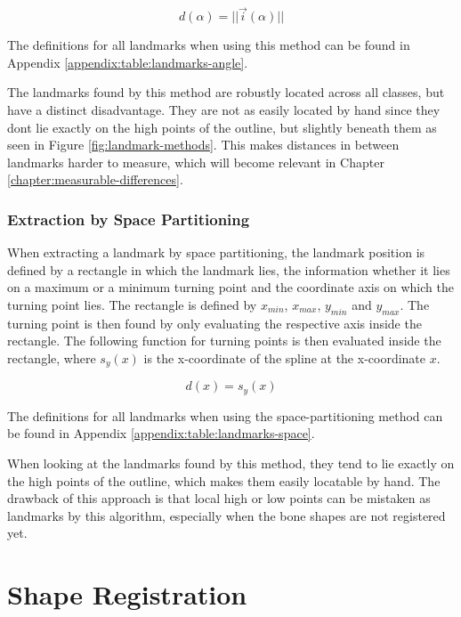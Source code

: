 \documentclass[pdftex,12pt,a4paper]{report}
\begin{document}
\begin{equation}
d(\alpha) = ||\vec{i}(\alpha)||
\end{equation}

The definitions for all landmarks when using this method can be found in Appendix \ref{appendix:table:landmarks-angle}.

The landmarks found by this method are robustly located across all classes, but have a distinct disadvantage. They are
not as easily located by hand since they dont lie exactly on the high points of the outline, but slightly beneath
them  as seen in Figure \ref{fig:landmark-methods}. This makes distances in between landmarks harder to measure, which
will become relevant in Chapter \ref{chapter:measurable-differences}.

\subsubsection{Extraction by Space Partitioning}

When extracting a landmark by space partitioning, the landmark position is defined by a rectangle in which the landmark
lies, the information whether it lies on a maximum or a minimum turning point and the coordinate axis on which the
turning point lies. The rectangle is defined by $x_{min}$, $x_{max}$, $y_{min}$ and $y_{max}$. The turning point
is then found by only evaluating the respective axis inside the rectangle. The following function for turning points
is then evaluated inside the rectangle, where $s_y(x)$ is the x-coordinate of the spline at the x-coordinate $x$.

\begin{equation}
d(x) = s_y(x)
\end{equation}

The definitions for all landmarks when using the space-partitioning method can be found in Appendix
\ref{appendix:table:landmarks-space}.

When looking at the landmarks found by this method, they tend to lie exactly on the high points of the outline, which
makes them easily locatable by hand. The drawback of this approach is that local high or low points can be mistaken as
landmarks by this algorithm, especially when the bone shapes are not registered yet.

\section{Shape Registration}
\end{document}
